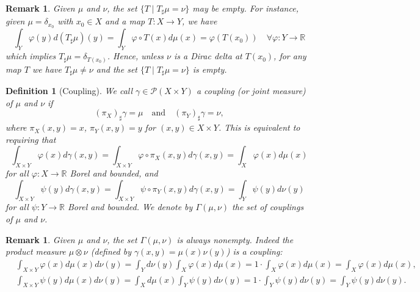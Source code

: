\documentclass[11pt]{book}
\newtheorem{definition}[theorem]{Definition}
\newtheorem{remark}[theorem]{Remark}
\begin{document}
\begin{remark}
Given \(\mu\) and \(\nu\), the set \(\{T \mid T_\sharp\mu = \nu\}\) may be empty. For instance, given \(\mu = \delta_{x_0}\) with \(x_0 \in X\) and a map \(T: X \rightarrow Y\), we have
\[
\int_Y \varphi(y) d(T_\sharp\mu)(y) = \int_Y \varphi \circ T(x) d\mu(x) = \varphi(T(x_0)) \quad \forall \varphi: Y \rightarrow \mathbb{R}
\]
which implies \(T_\sharp\mu = \delta_{T(x_0)}\). Hence, unless \(\nu\) is a Dirac delta at \(T(x_0)\), for any map \(T\) we have \(T_\sharp\mu \neq \nu\) and the set \(\{T \mid T_\sharp\mu = \nu\}\) is empty.
\end{remark}




\begin{definition}[Coupling]
We call \(\gamma \in \mathcal{P}(X \times Y)\) a coupling (or joint measure) of \(\mu\) and \(\nu\) if 
\[
(\pi_X)_\sharp \gamma = \mu \quad \text{and} \quad (\pi_Y)_\sharp \gamma = \nu,
\]
where \(\pi_X(x, y) = x\), \(\pi_Y(x, y) = y\) for \((x, y) \in X \times Y\). This is equivalent to requiring that
\[
\int_{X \times Y} \varphi(x)d\gamma(x,y) 
= \int_{X \times Y} \varphi \circ \pi_X (x,y) d\gamma(x,y)
= \int_X \varphi(x)d\mu(x)
\]
for all \(\varphi: X \rightarrow \mathbb{R}\) Borel and bounded, and
\[
\int_{X \times Y} \psi(y)d\gamma(x,y) 
= \int_{X \times Y} \psi \circ \pi_Y (x,y) d\gamma(x,y)
= \int_Y \psi(y)d\nu(y)
\]
for all \(\psi: Y \rightarrow \mathbb{R}\) Borel and bounded. We denote by \(\Gamma(\mu, \nu)\) the set of couplings of \(\mu\) and \(\nu\).
\end{definition}

\begin{remark}
Given \(\mu\) and \(\nu\), the set \(\Gamma(\mu, \nu)\) is always nonempty. Indeed the product measure \(\mu \otimes \nu\) (defined by \(\gamma(x, y) = \mu(x) \nu(y)\)) is a coupling:
\begin{align*}
&\int_{X \times Y} \varphi(x) d\mu(x) d\nu(y) = \int_Y d\nu(y) \int_X \varphi(x) d\mu(x) = 1 \cdot \int_X \varphi(x) d\mu(x) = \int_X \varphi(x) d\mu(x), \\
&\int_{X \times Y} \psi(y) d\mu(x) d\nu(y) = \int_X d\mu(x) \int_Y \psi(y) d\nu(y) = 1 \cdot \int_Y \psi(y) d\nu(y) = \int_Y \psi(y) d\nu(y).
\end{align*}
\end{remark}
\end{document}
